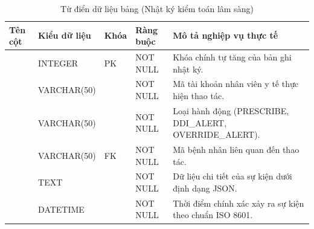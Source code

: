 \begin{table}[htbp]
\centering
\small
\begin{tabularx}{\textwidth}{L{3.2cm} L{2.2cm} C{1.2cm} C{1.8cm} Y}
\toprule
\textbf{Tên cột} & \textbf{Kiểu dữ liệu} & \textbf{Khóa} & \textbf{Ràng buộc} & \textbf{Mô tả nghiệp vụ thực tế} \\
\midrule
{} & INTEGER & PK & NOT NULL & Khóa chính tự tăng của bản ghi nhật ký. \\
 & VARCHAR(50) & & NOT NULL & Mã tài khoản nhân viên y tế thực hiện thao tác. \\
 & VARCHAR(50) & & NOT NULL & Loại hành động (PRESCRIBE, DDI_ALERT, OVERRIDE_ALERT). \\
 & VARCHAR(50) & FK & NOT NULL & Mã bệnh nhân liên quan đến thao tác. \\
 & TEXT & & NOT NULL & Dữ liệu chi tiết của sự kiện dưới định dạng JSON. \\
 & DATETIME & & NOT NULL & Thời điểm chính xác xảy ra sự kiện theo chuẩn ISO 8601. \\
\bottomrule
\end{tabularx}
\caption{Từ điển dữ liệu bảng  (Nhật ký kiểm toán lâm sàng)}
\end{table}

